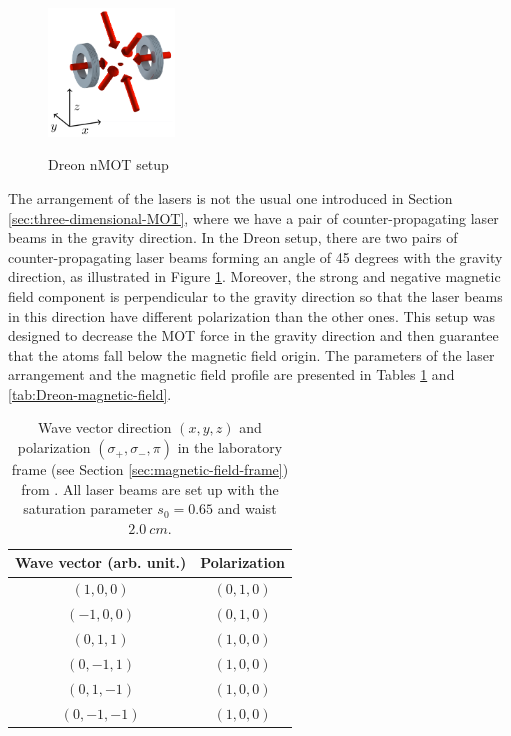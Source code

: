 \begin{figure}
    \centering
    \vspace{-15px}
    \caption{Dreon nMOT setup}
    \includegraphics[width=0.3\textwidth]{USPSC-img/Dreon-setup.png}
    \label{fig:Dreon-setup}
    \vspace{-10px}
\end{figure}
The arrangement of the lasers is not the usual one introduced in Section \ref{sec:three-dimensional-MOT}, where we have a pair of counter-propagating laser beams in the gravity direction. In the Dreon setup, there are two pairs of counter-propagating laser beams forming an angle of 45 degrees with the gravity direction, as illustrated in Figure \ref{fig:Dreon-setup}. Moreover, the strong and negative magnetic field component is perpendicular to the gravity direction so that the laser beams in this direction have different polarization than the other ones. This setup was designed to decrease the MOT force in the gravity direction and then guarantee that the atoms fall below the magnetic field origin. The parameters of the laser arrangement and the magnetic field profile are presented in Tables \ref{tab:Dreon-laser-beams} and \ref{tab:Dreon-magnetic-field}.

\begin{table}[ht!]
    \centering
    \begin{tabular}{|c|c|}
        \hline
        \textbf{Wave vector (arb. unit.)} & \textbf{Polarization} \\ \hline
        $ (1, 0, 0) $ & $ (0, 1, 0) $ \\
        $ (-1, 0, 0) $ & $ (0, 1, 0) $ \\
        $ (0, 1, 1) $ & $ (1, 0, 0) $ \\
        $ (0, -1, 1) $ & $ (1, 0, 0) $ \\
        $ (0, 1, -1) $ & $ (1, 0, 0) $ \\
        $ (0, -1, -1) $ & $ (1, 0, 0) $ \\
        \hline
    \end{tabular}
    \caption{Wave vector direction $ (x, y, z) $ and polarization $ (\sigma_+, \sigma_-, \pi) $ in the laboratory frame (see Section \ref{sec:magnetic-field-frame}) from \cite{dreon2017optical}. All laser beams are set up with the saturation parameter $ s_0 = 0.65 $ and waist $ 2.0\ cm $.}
    \label{tab:Dreon-laser-beams}
\end{table}

